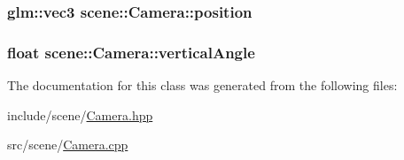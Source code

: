 \hypertarget{classscene_1_1Camera_a7d332cc5b22833c6d38e4361d069b37a}{
\subsubsection[{position}]{\setlength{\rightskip}{0pt plus 5cm}glm\-::vec3 scene\-::\-Camera\-::position}}\label{classscene_1_1Camera_a7d332cc5b22833c6d38e4361d069b37a}
\hypertarget{classscene_1_1Camera_a9d2c6334e97bd75a8d7da8f6ffe59127}{
\subsubsection[{vertical\-Angle}]{\setlength{\rightskip}{0pt plus 5cm}float scene\-::\-Camera\-::vertical\-Angle}}\label{classscene_1_1Camera_a9d2c6334e97bd75a8d7da8f6ffe59127}


The documentation for this class was generated from the following files\-:\begin{DoxyCompactItemize}
\item 
include/scene/\hyperlink{Camera_8hpp}{Camera.\-hpp}\item 
src/scene/\hyperlink{Camera_8cpp}{Camera.\-cpp}\end{DoxyCompactItemize}
